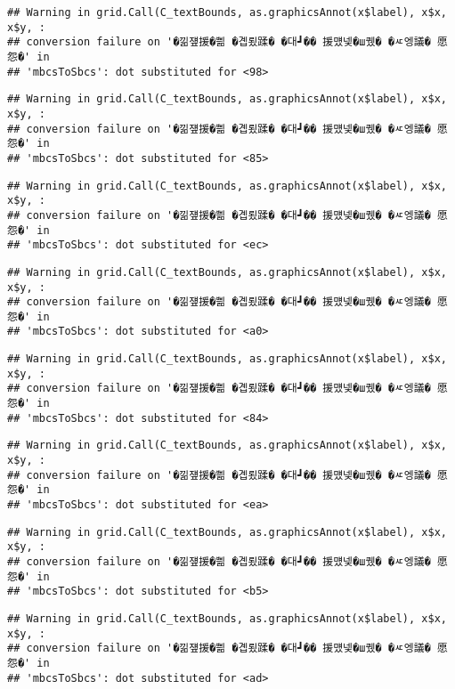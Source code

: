 \documentclass[
]{article}
\begin{document}
\begin{verbatim}
## Warning in grid.Call(C_textBounds, as.graphicsAnnot(x$label), x$x, x$y, :
## conversion failure on '�낆쟾援�쁾 �곕룄蹂� �대┛�� 援먰넻�ш퀬� �ㅼ엥議� 愿怨�' in
## 'mbcsToSbcs': dot substituted for <98>
\end{verbatim}

\begin{verbatim}
## Warning in grid.Call(C_textBounds, as.graphicsAnnot(x$label), x$x, x$y, :
## conversion failure on '�낆쟾援�쁾 �곕룄蹂� �대┛�� 援먰넻�ш퀬� �ㅼ엥議� 愿怨�' in
## 'mbcsToSbcs': dot substituted for <85>
\end{verbatim}

\begin{verbatim}
## Warning in grid.Call(C_textBounds, as.graphicsAnnot(x$label), x$x, x$y, :
## conversion failure on '�낆쟾援�쁾 �곕룄蹂� �대┛�� 援먰넻�ш퀬� �ㅼ엥議� 愿怨�' in
## 'mbcsToSbcs': dot substituted for <ec>
\end{verbatim}

\begin{verbatim}
## Warning in grid.Call(C_textBounds, as.graphicsAnnot(x$label), x$x, x$y, :
## conversion failure on '�낆쟾援�쁾 �곕룄蹂� �대┛�� 援먰넻�ш퀬� �ㅼ엥議� 愿怨�' in
## 'mbcsToSbcs': dot substituted for <a0>
\end{verbatim}

\begin{verbatim}
## Warning in grid.Call(C_textBounds, as.graphicsAnnot(x$label), x$x, x$y, :
## conversion failure on '�낆쟾援�쁾 �곕룄蹂� �대┛�� 援먰넻�ш퀬� �ㅼ엥議� 愿怨�' in
## 'mbcsToSbcs': dot substituted for <84>
\end{verbatim}

\begin{verbatim}
## Warning in grid.Call(C_textBounds, as.graphicsAnnot(x$label), x$x, x$y, :
## conversion failure on '�낆쟾援�쁾 �곕룄蹂� �대┛�� 援먰넻�ш퀬� �ㅼ엥議� 愿怨�' in
## 'mbcsToSbcs': dot substituted for <ea>
\end{verbatim}

\begin{verbatim}
## Warning in grid.Call(C_textBounds, as.graphicsAnnot(x$label), x$x, x$y, :
## conversion failure on '�낆쟾援�쁾 �곕룄蹂� �대┛�� 援먰넻�ш퀬� �ㅼ엥議� 愿怨�' in
## 'mbcsToSbcs': dot substituted for <b5>
\end{verbatim}

\begin{verbatim}
## Warning in grid.Call(C_textBounds, as.graphicsAnnot(x$label), x$x, x$y, :
## conversion failure on '�낆쟾援�쁾 �곕룄蹂� �대┛�� 援먰넻�ш퀬� �ㅼ엥議� 愿怨�' in
## 'mbcsToSbcs': dot substituted for <ad>
\end{verbatim}
\end{document}
